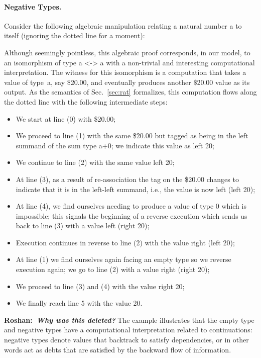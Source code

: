 \documentclass[preprint]{sigplanconf}
\newcommand{\xcomment}[2]{\textbf{#1:~\textsl{#2}}}
\newcommand{\roshan}[1]{\xcomment{Roshan}{#1}}
\begin{document}
\paragraph*{Negative Types.} 
Consider the following algebraic manipulation relating a natural number {{a}}
to itself (ignoring the dotted line for a moment):
\begin{center}
\end{center}
Although seemingly pointless, this algebraic proof corresponds, in our model,
to an isomorphism of type {{a <-> a}} with a non-trivial and interesting
computational interpretation. The witness for this isomorphism is a
computation that takes a value of type~{{a}}, say \$20.00, and eventually
produces another \$20.00 value as its output. As the semantics of
Sec.~\ref{sec:rat} formalizes, this computation flows along the dotted line
with the following intermediate steps:
\begin{itemize}
\item We start at line (0) with \$20.00; 
\item We proceed to line (1) with the same \$20.00 but tagged as being
  in the left summand of the sum type {{a+0}}; we indicate this value
  as {{left 20}};
\item We continue to line (2) with the same value {{left 20}};
\item At line (3), as a result of re-association the tag on the \$20.00
  changes to indicate that it is in the left-left summand, i.e., the value is
  now {{left (left 20)}};
\item At line (4), we find ourselves needing to produce a value of type 0
  which is impossible; this signals the beginning of a reverse execution
  which sends us back to line (3) with a value {{left (right 20)}};
\item Execution continues in reverse to line (2) with the value 
  {{right (left 20)}};
\item At line (1) we find ourselves again facing an empty type so we reverse
  execution again; we go to line (2) with a value {{right (right 20)}};
\item We proceed to line (3) and (4) with the value {{right 20}};
\item We finally reach line 5 with the value {{20}}.
\end{itemize}
\roshan{Why was this deleted?}
The example illustrates that the empty type and negative types have a
computational interpretation related to continuations: negative types denote
values that backtrack to satisfy dependencies, or in other words act as debts
that are satisfied by the backward flow of information.
\end{document}
